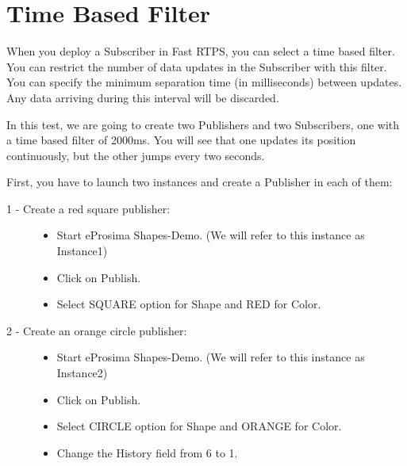 \documentclass[letterpaper,10pt,english]{sphinxmanual}
\begin{document}


\chapter{Time Based Filter}
\label{\detokenize{time_based_filter:time-based-filter}}\label{\detokenize{time_based_filter::doc}}
When you deploy a Subscriber in Fast RTPS, you can select a time based filter. You can restrict the number of data updates in the Subscriber with this filter. You can specify the minimum separation time (in milliseconds) between updates. Any data arriving during this interval will be discarded.

In this test, we are going to create two Publishers and two Subscribers, one with a time based filter of 2000ms. You will see that one updates its position continuously, but the other jumps every two seconds.


First, you have to launch two instances and create a Publisher in each of them:
\begin{description}
\item[{1 - Create a red square publisher:}] \leavevmode\begin{itemize}
\item {} 
Start eProsima Shapes-Demo. (We will refer to this instance as Instance1)

\item {} 
Click on Publish.

\item {} 
Select SQUARE option for Shape and RED for Color.

\end{itemize}

\item[{2 - Create an orange circle publisher:}] \leavevmode\begin{itemize}
\item {} 
Start eProsima Shapes-Demo. (We will refer to this instance as Instance2)

\item {} 
Click on Publish.

\item {} 
Select CIRCLE option for Shape and ORANGE for Color.

\item {} 
Change the History field from 6 to 1.

\end{itemize}

\end{description}
\end{document}
